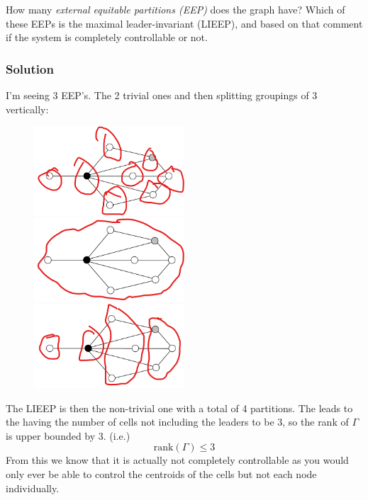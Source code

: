 \documentclass[]{article}
\numberwithin{equation}{section}
\begin{document}
How many \emph{external equitable partitions (EEP)} does the graph have? 
Which of these EEPs is the maximal leader-invariant (LIEEP), and based on that comment if the system is completely controllable or not.

\subsubsection*{Solution}
I'm seeing 3 EEP's. 
The 2 trivial ones and then splitting groupings of 3 vertically:
\begin{figure}[h]
    \centering
    \includegraphics[width=0.5\textwidth]{figs/pblm5a_1.png}\\
    \includegraphics[width=0.5\textwidth]{figs/pblm5a_2.png}\\
    \includegraphics[width=0.5\textwidth]{figs/pblm5a_3.png}
\end{figure}

The LIEEP is then the non-trivial one with a total of 4 partitions.
The leads to the having the number of cells not including the leaders to be $3$, so the rank of $\Gamma$ is upper bounded by 3.
(i.e.)\[
    \text{rank}(\Gamma) \leq 3
\]
From this we know that it is actually not completely controllable as you would only ever be able to control the centroids of the cells but not each node individually.
\end{document}
